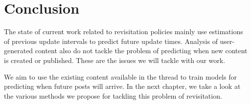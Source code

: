
\section{Conclusion}
The state of current work related to revisitation policies mainly use 
estimations of previous update intervals to predict future update times.  
Analysis of user-generated content also do not tackle the problem of predicting 
when new content is created or published. These are the issues we will tackle 
with our work.

We aim to use the existing content available in the thread to train models for 
predicting when future posts will arrive. In the next chapter, we take a look at 
the various methods we propose for tackling this problem of revisitation.
